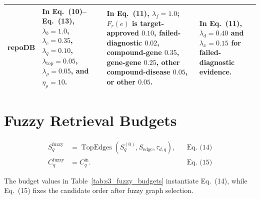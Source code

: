 \documentclass[11pt]{article}
\newcommand{\mainequation}[1]{Eq.~(#1)}
\begin{document}
\begin{table}[H]
\begin{tabularx}{\textwidth}{L{0.12\textwidth} Y Y Y}
    \addlinespace
    repoDB &
    In \mainequation{10}--\mainequation{13}, \(\lambda_b=1.0\), \(\lambda_c=0.35\), \(\lambda_q=0.10\), \(\lambda_{\mathrm{top}}=0.05\), \(\lambda_\rho=0.05\), and \(\eta_\rho=10\). &
    In \mainequation{11}, \(\lambda_f=1.0\); \(F_r(e)\) is target-approved \(0.10\), failed-diagnostic \(0.02\), compound-gene \(0.35\), gene-gene \(0.25\), other compound-disease \(0.05\), or other \(0.05\). &
    In \mainequation{11}, \(\lambda_d=0.40\) and \(\lambda_x=0.15\) for failed-diagnostic evidence. \\
    \bottomrule
    \end{tabularx}
    \end{table}
    \FloatBarrier

    \clearpage

    \section{Fuzzy Retrieval Budgets}

    \[
    \begin{aligned}
    S^{\mathrm{fuzzy}}_q&=
    \operatorname{TopEdges}\!\left(S^{(0)}_q,S_{\mathrm{edge}},\tau_{d,q}\right), &&\text{\mainequation{14}}\\
    C^{\mathrm{fuzzy}}_q&=C^{\mathrm{in}}_q. &&\text{\mainequation{15}}
    \end{aligned}
    \]

    The budget values in Table~\ref{tab:s3_fuzzy_budgets} instantiate \mainequation{14}, while \mainequation{15} fixes the candidate order after fuzzy graph selection.
\end{document}

